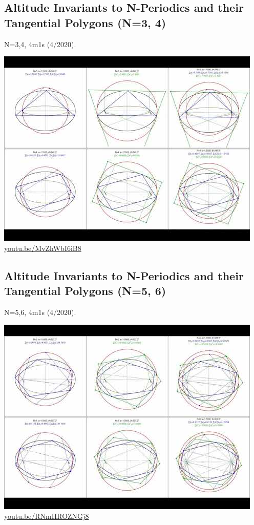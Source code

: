 \documentclass[12pt]{amsart}
\begin{document}
\subsection{Altitude Invariants to N-Periodics and their Tangential Polygons (N=3, 4)}
\label{vid:MvZhWbI6iB8}
\noindent N=3,4, 4m1s (4/2020). 
\begin{center}\includegraphics[width=.5\textwidth]{pics/MvZhWbI6iB8.jpg} \\ 
\href{https://youtu.be/MvZhWbI6iB8}{\url{youtu.be/MvZhWbI6iB8}}\end{center}
% 

\subsection{Altitude Invariants to N-Periodics and their Tangential Polygons (N=5, 6)}
\label{vid:RNmHROZNGj8}
\noindent N=5,6, 4m1s (4/2020). 
\begin{center}\includegraphics[width=.5\textwidth]{pics/RNmHROZNGj8.jpg} \\ 
\href{https://youtu.be/RNmHROZNGj8}{\url{youtu.be/RNmHROZNGj8}}\end{center}
% 
\end{document}
